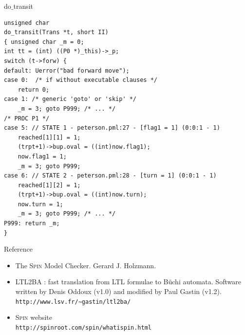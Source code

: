 \documentclass[12pt]{beamer}
\newcommand{\code}[1]{\texttt{#1}}
\begin{document}
\begin{frame}[fragile]{do$\_$transit}
\begin{lstlisting}[basicstyle=\scriptsize]
unsigned char
do_transit(Trans *t, short II)
{ unsigned char _m = 0;
int tt = (int) ((P0 *)_this)->_p;
switch (t->forw) {
default: Uerror("bad forward move");
case 0:  /* if without executable clauses */
    return 0;
case 1: /* generic 'goto' or 'skip' */
    _m = 3; goto P999; /* ... */
/* PROC P1 */
case 5: // STATE 1 - peterson.pml:27 - [flag1 = 1] (0:0:1 - 1)
    reached[1][1] = 1;
    (trpt+1)->bup.oval = ((int)now.flag1);
    now.flag1 = 1;
    _m = 3; goto P999;
case 6: // STATE 2 - peterson.pml:28 - [turn = 1] (0:0:1 - 1)
    reached[1][2] = 1;
    (trpt+1)->bup.oval = ((int)now.turn);
    now.turn = 1;
    _m = 3; goto P999; /* ... */
P999: return _m;
}
\end{lstlisting}
\end{frame}


\begin{frame}{Reference}
\begin{itemize}
    \item The \textsc{Spin} Model Checker. Gerard J. Holzmann.
    \item LTL2BA : fast translation from LTL formulae to Büchi automata. Software written by Denis
Oddoux (v1.0) and modified by Paul Gastin (v1.2).\\
        \code{http://www.lsv.fr/∼gastin/ltl2ba/}
    \item \textsc{Spin} website\\
        \code{http://spinroot.com/spin/whatispin.html
}
\end{itemize}
\end{frame}
\end{document}
